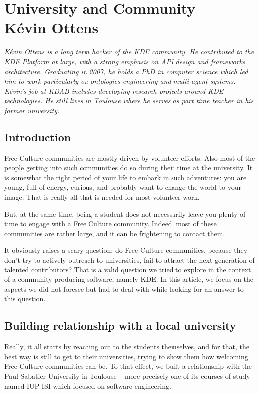 \chapter{University and Community -- Kévin Ottens}

\textit{Kévin Ottens is a long term hacker of the KDE community. He contributed
to the KDE Platform at large, with a strong emphasis on API design and
frameworks architecture. Graduating in 2007, he holds a PhD in computer science
which led him to work particularly on ontologies engineering and multi-agent
systems. Kévin's job at KDAB includes developing research projects around KDE
technologies. He still lives in Toulouse where he serves as part time teacher in
his former university.}

\section*{Introduction}
Free Culture communities are mostly driven by volunteer efforts. Also most of
the people getting into such communities do so during their time at the
university. It is somewhat the right period of your life to embark in such
adventures: you are young, full of energy, curious, and probably want to change
the world to your image. That is really all that is needed for most volunteer
work.

But, at the same time, being a student does not necessarily leave you plenty of
time to engage with a Free Culture community. Indeed, most of these communities
are rather large, and it can be frightening to contact them.

It obviously raises a scary question: do Free Culture communities, because they
don't try to actively outreach to universities, fail to attract the next generation
of talented contributors?
That is a valid question we tried to explore in the context of a community
producing software, namely KDE. In this article, we focus on the aspects we did
not foresee but had to deal with while looking for an answer to this question.

\section*{Building relationship with a local university}
Really, it all starts by reaching out to the students themselves, and for that,
the best way is still to get to their universities, trying to show them how
welcoming Free Culture communities can be. To that effect, we built a
relationship with the Paul Sabatier University in Toulouse -- more precisely one
of its courses of study named IUP ISI which focused on software engineering.

